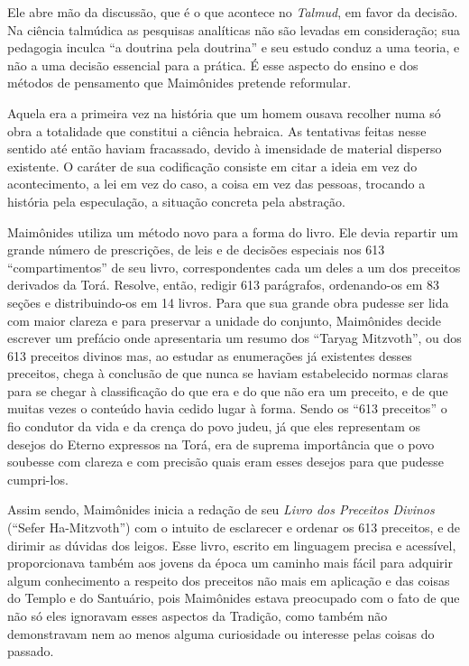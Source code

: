 Ele abre mão da discussão, que é o que acontece no \emph{Talmud}, em
favor da decisão. Na ciência talmúdica as pesquisas analíticas não são
levadas em consideração; sua pedagogia inculca ``a doutrina pela
doutrina'' e seu estudo conduz a uma teoria, e não a uma decisão
essencial para a prática. É esse aspecto do ensino e dos métodos de
pensamento que Maimônides pretende reformular.

Aquela era a primeira vez na história que um homem ousava recolher numa
só obra a totalidade que constitui a ciência hebraica. As tentativas
feitas nesse sentido até então haviam fracassado, devido à imensidade de
material disperso existente. O caráter de sua codificação consiste em
citar a ideia em vez do acontecimento, a lei em vez do caso, a coisa em
vez das pessoas, trocando a história pela especulação, a situação
concreta pela abstração.

Maimônides utiliza um método novo para a forma do livro. Ele devia
repartir um grande número de prescrições, de leis e de decisões
especiais nos 613 ``compartimentos'' de seu livro, correspondentes cada
um deles a um dos preceitos derivados da Torá. Resolve, então,
redigir 613 parágrafos, ordenando-os em 83 seções e distribuindo-os em
14 livros. Para que sua grande obra pudesse ser lida com maior clareza e
para preservar a unidade do conjunto, Maimônides decide escrever um
prefácio onde apresentaria um resumo dos ``Taryag Mitzvoth'', ou dos
613 preceitos divinos mas, ao estudar as enumerações já existentes
desses preceitos, chega à conclusão de que nunca se haviam estabelecido
normas claras para se chegar à classificação do que era e do que não era
um preceito, e de que muitas vezes o conteúdo havia cedido lugar à
forma. Sendo os ``613 preceitos'' o fio condutor da vida e da crença do
povo judeu, já que eles representam os desejos do Eterno expressos na
Torá, era de suprema importância que o povo soubesse com
clareza e com precisão quais eram esses desejos para que pudesse
cumpri-los.

Assim sendo, Maimônides inicia a redação de seu \emph{Livro dos
Preceitos Divinos} (``Sefer Ha-Mitzvoth'') com o intuito de esclarecer
e ordenar os 613 preceitos, e de dirimir as dúvidas dos leigos. Esse
livro, escrito em linguagem precisa e acessível, proporcionava também
aos jovens da época um caminho mais fácil para adquirir algum
conhecimento a respeito dos preceitos não mais em aplicação e das coisas
do Templo e do Santuário, pois Maimônides estava preocupado com o fato
de que não só eles ignoravam esses aspectos da Tradição, como também
não demonstravam nem ao menos alguma curiosidade ou interesse pelas
coisas do passado.

